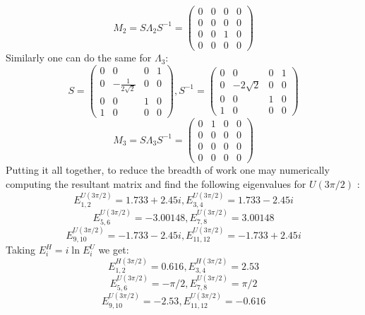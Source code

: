 \begin{equation}
    M_{2} = S\Lambda_{2}S^{-1} = \begin{pmatrix} 0 & 0 & 0 & 0 \\ 0 & 0 & 0 & 0 \\ 0 & 0 & 1 & 0 \\ 0 & 0&0&0 \end{pmatrix}
\end{equation}
Similarly one can do the same for $\Lambda_{3}$:
\begin{equation}
    S = \begin{pmatrix} 0 & 0 & 0 & 1 \\ 0 & -\frac{1}{2\sqrt{2}} & 0 & 0 \\ 0 & 0 & 1 & 0 \\ 1 & 0 & 0 & 0 \end{pmatrix}, S^{-1} = \begin{pmatrix} 0 & 0 & 0 & 1 \\ 0 & -2\sqrt{2} & 0 & 0 \\ 0 & 0 & 1 & 0 \\ 1 & 0 & 0 & 0 \end{pmatrix}
\end{equation}
\begin{equation}
    M_{3} = S\Lambda_{3}S^{-1} = \begin{pmatrix} 0 & 1 & 0 & 0 \\ 0 & 0 & 0 & 0 \\ 0 & 0 & 0 & 0 \\ 0 & 0 & 0 & 0 \end{pmatrix}
\end{equation}
Putting it all together, to reduce the breadth of work one may numerically computing the resultant matrix and find the following eigenvalues for $U(3\pi/2)$ :
\begin{equation}
    E_{1,2}^{U(3\pi/2)} = 1.733 + 2.45i, E_{3,4}^{U(3\pi/2)} = 1.733-2.45i
\end{equation}
\begin{equation}
    E_{5,6}^{U(3\pi/2)} = -3.00148 , E_{7,8}^{U(3\pi/2)} = 3.00148
\end{equation}
\begin{equation}
    E_{9,10}^{U(3\pi/2)} = -1.733 - 2.45i , E_{11, 12}^{U(3\pi/2)} = -1.733 + 2.45i
\end{equation}
Taking $E_{i}^{H} = i\ln E_{i}^{U}$ we get:
\begin{equation}
     E_{1,2}^{H(3\pi/2)} = 0.616,  E_{3,4}^{H(3\pi/2)} = 2.53
\end{equation}
\begin{equation}
     E_{5,6}^{U(3\pi/2)} = -\pi/2  , E_{7,8}^{U(3\pi/2)} = \pi/2  
\end{equation}
\begin{equation}
    E_{9,10}^{U(3\pi/2)} = -2.53 , E_{11,12}^{U(3\pi/2)} = -0.616   
\end{equation}
